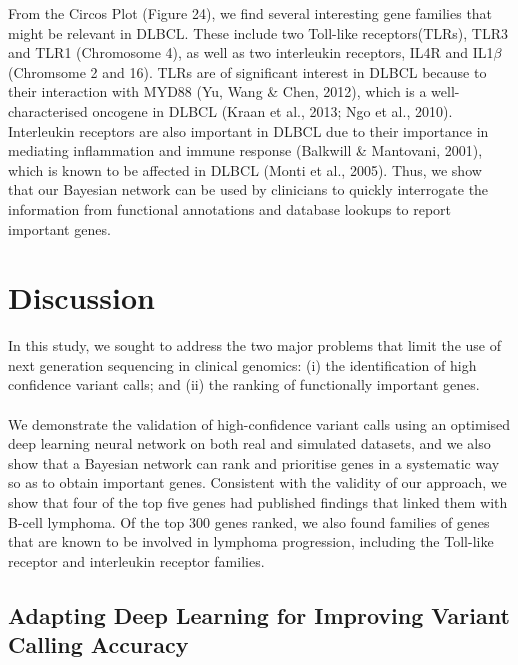 \documentclass{article}
\begin{document}
From the Circos Plot (Figure 24), we find several interesting gene families that might be relevant in DLBCL. These include two Toll-like receptors(TLRs), TLR3 and TLR1 (Chromosome 4), as well as two interleukin receptors, IL4R and IL1$\beta$ (Chromsome 2 and 16). TLRs are of significant interest in DLBCL because to their interaction with MYD88 (Yu, Wang \& Chen, 2012), which is a well-characterised oncogene in DLBCL (Kraan et al., 2013; Ngo et al., 2010). Interleukin receptors are also important in DLBCL due to their importance in mediating inflammation and immune response (Balkwill \& Mantovani, 2001), which is known to be affected in DLBCL (Monti et al., 2005). Thus, we show that our Bayesian network can be used by clinicians to quickly interrogate the information from functional annotations and database lookups to report important genes.

\newpage
\section{Discussion}
In this study, we sought to address the two major problems that limit the use of next generation sequencing in clinical genomics: (i) the identification of high confidence variant calls; and (ii) the ranking of functionally important genes.\\\\
We demonstrate the validation of high-confidence variant calls using an optimised deep learning neural network on both real and simulated datasets, and we also show that a Bayesian network can rank and prioritise genes in a systematic way so as to obtain important genes. Consistent with the validity of our approach, we show that four of the top five genes had published findings that linked them with B-cell lymphoma. Of the top 300 genes ranked, we also found  families of genes that are known to be involved in lymphoma progression, including the Toll-like receptor and interleukin receptor families. 







\subsection{Adapting Deep Learning for Improving Variant Calling Accuracy}
\end{document}
